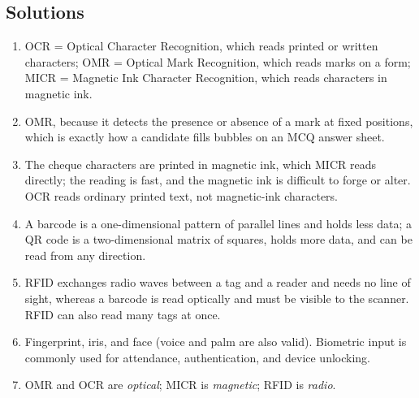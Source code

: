 \documentclass[11pt]{article}
\begin{document}
\subsection*{Solutions}
\begingroup\small
\begin{enumerate}[label=\arabic*.]
  \item OCR = Optical Character Recognition, which reads printed or written
    characters; OMR = Optical Mark Recognition, which reads marks on a form;
    MICR = Magnetic Ink Character Recognition, which reads characters in
    magnetic ink.
  \item OMR, because it detects the presence or absence of a mark at fixed
    positions, which is exactly how a candidate fills bubbles on an MCQ
    answer sheet.
  \item The cheque characters are printed in magnetic ink, which MICR reads
    directly; the reading is fast, and the magnetic ink is difficult to
    forge or alter. OCR reads ordinary printed text, not magnetic-ink
    characters.
  \item A barcode is a one-dimensional pattern of parallel lines and holds
    less data; a QR code is a two-dimensional matrix of squares, holds more
    data, and can be read from any direction.
  \item RFID exchanges radio waves between a tag and a reader and needs no
    line of sight, whereas a barcode is read optically and must be visible
    to the scanner. RFID can also read many tags at once.
  \item Fingerprint, iris, and face (voice and palm are also valid).
    Biometric input is commonly used for attendance, authentication, and
    device unlocking.
  \item OMR and OCR are \emph{optical}; MICR is \emph{magnetic}; RFID is
    \emph{radio}.
\end{enumerate}
\endgroup
\end{document}
